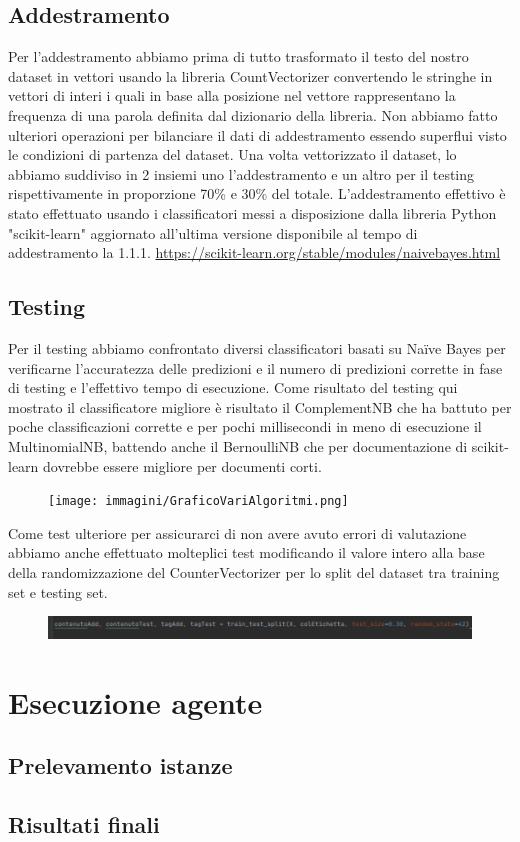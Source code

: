 \documentclass{report}
\begin{document}
    \section{Addestramento}
    Per l'addestramento abbiamo prima di tutto trasformato il testo del nostro dataset in vettori usando la libreria CountVectorizer convertendo le stringhe in vettori di interi i quali in base alla posizione nel vettore rappresentano la frequenza di una parola definita dal dizionario della libreria.
    Non abbiamo fatto ulteriori operazioni per bilanciare il dati di addestramento essendo superflui visto le condizioni di partenza del dataset.
    Una volta vettorizzato il dataset, lo abbiamo suddiviso in 2 insiemi uno l'addestramento e un altro per il testing rispettivamente in proporzione 70\% e 30\% del totale.
    \newline
    L'addestramento effettivo è stato effettuato usando i classificatori messi a disposizione dalla libreria Python "scikit-learn" aggiornato all'ultima versione disponibile al tempo di addestramento la 1.1.1.
    \href{https://scikit-learn.org/stable/modules/naive_bayes.html}{https://scikit-learn.org/stable/modules/naive\textunderscore bayes.html}
    
    
    
    
\newpage
    \section{Testing}
    Per il testing abbiamo confrontato diversi classificatori basati su Naïve Bayes per verificarne l'accuratezza delle predizioni e il numero di predizioni corrette in fase di testing e l'effettivo tempo di esecuzione. Come risultato del testing qui mostrato il classificatore migliore è risultato il ComplementNB che ha battuto per poche classificazioni corrette e per pochi millisecondi in meno di esecuzione il MultinomialNB, battendo anche il BernoulliNB che per documentazione di scikit-learn dovrebbe essere migliore per documenti corti.
        \begin{figure}[h!]
            \centering
            \texttt{[image: immagini/GraficoVariAlgoritmi.png]}
        \end{figure}
    Come test ulteriore per assicurarci di non avere avuto errori di valutazione abbiamo anche effettuato molteplici test modificando il valore intero alla base della randomizzazione del CounterVectorizer per lo split del dataset tra training set e testing set. 
    \begin{figure}[h!]
            \centering
            \includegraphics[width =\textwidth]{immagini/randomState.png}
        \end{figure}
    
    \chapter{Esecuzione agente}

    \section{Prelevamento istanze}

    \section{Risultati finali}
\end{document}
